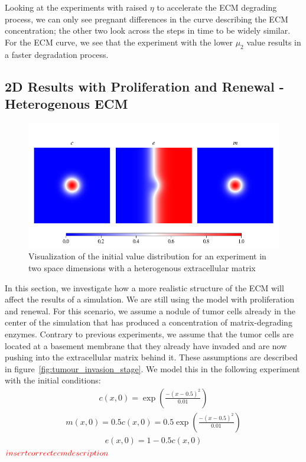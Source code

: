 Looking at the experiments with raised $\eta$ to accelerate the ECM degrading process, we can only see pregnant differences in the curve describing the ECM concentration; the other two look across the steps in time to be widely similar. For the ECM curve, we see that the experiment with the lower $\mu_2$ value results in a faster degradation process.






\subsection{2D Results with Proliferation and Renewal - Heterogenous ECM}
\begin{figure}[h]
 \centering
 \label{fig:Initial_Value_Distribution}
 \includegraphics[width=\textwidth]{resources/images/2D_initial_conditions_heterogenous_ECM.png}
 \caption{Visualization of the initial value distribution for an experiment in two space dimensions with a heterogenous extracellular matrix}
 \label{fig:2D_heterogenous_ECM_initial}
\end{figure}
In this section, we investigate how a more realistic structure of the ECM will affect the results of a simulation. We are still using the model with proliferation and renewal. 
For this scenario, we assume a nodule of tumor cells already in the center of the simulation that has produced a concentration of matrix-degrading enzymes. Contrary to previous experiments, we assume that the tumor cells are located at a basement membrane that they already have invaded and are now pushing into the extracellular matrix behind it. These assumptions are described in figure~\ref{fig:tumour_invasion_stage}. We model this in the following experiment with the initial conditions:
\begin{align*}
 c(x,0)= \exp(\frac{-(x-0.5)^2}{0.01})
\end{align*}
\begin{align*}
 m(x,0) = 0.5 c(x,0) = 0.5 \exp(\frac{-(x-0.5)^2}{0.01})
\end{align*}
\begin{align*}
 e(x,0) = 1 - 0.5 c(x,0)
\end{align*}
$\textcolor{red}{insert correct ecm description}$

